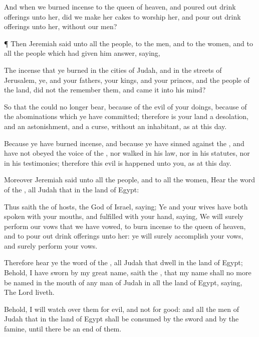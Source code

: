 {And when we burned
incense to the
queen of
heaven, and poured
out drink
offerings unto her, did we
make her
cakes to
worship her, and pour
out drink
offerings unto her,
without our
men?


\par }{\PP {}¶ Then
Jeremiah
said unto all the
people, to the
men, and to the
women, and to all the
people which had given him
{}
answer,
saying,

The
incense that ye
burned in the
cities of
Judah, and in the
streets of
Jerusalem, ye, and your
fathers, your
kings, and your
princes, and the
people of the
land, did not the
{}
remember them, and
came it
{} into his
mind?

So that the
{}
could no longer
bear,
because of the
evil of your
doings,
{}
because of the
abominations which ye have
committed; therefore is your
land a
desolation, and an
astonishment, and a
curse, without an
inhabitant, as at this
day.

Because ye have burned
incense, and because ye have
sinned against the
{}, and have not
obeyed the
voice of the
{}, nor
walked in his
law, nor in his
statutes, nor in his
testimonies; therefore this
evil is
happened unto you, as at this
day.

Moreover
Jeremiah
said unto all the
people, and to all the
women,
Hear the
word of the
{}, all
Judah that
{} in the
land of
Egypt:

Thus
saith the
{} of
hosts, the
God of
Israel,
saying; Ye and your
wives have both
spoken with your
mouths, and
fulfilled with your
hand,
saying, We will
surely
perform our
vows that we have
vowed, to burn
incense to the
queen of
heaven, and to pour
out drink
offerings unto her: ye will
surely
accomplish your
vows, and
surely
perform your
vows.

Therefore
hear ye the
word of the
{}, all
Judah that
dwell in the
land of
Egypt; Behold, I have
sworn by my
great
name,
saith the
{}, that my
name shall no more be
named in the
mouth of any
man of
Judah in all the
land of
Egypt,
saying, The
Lord
{}
liveth.

Behold, I will
watch over them for
evil, and not for
good: and all the
men of
Judah that
{} in the
land of
Egypt shall be
consumed by the
sword and by the
famine, until there be an
end of them.

}
